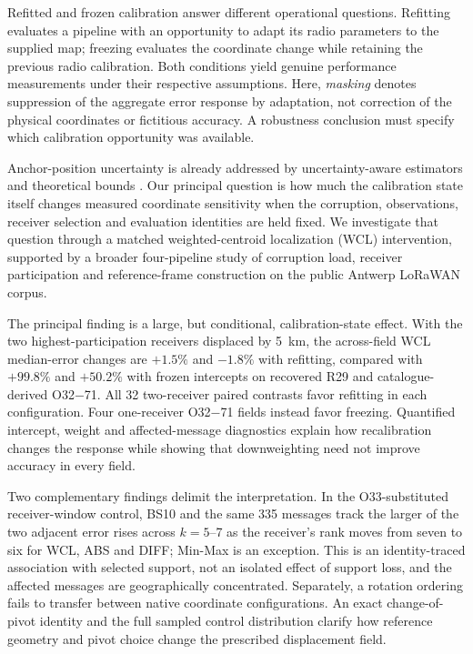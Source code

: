 \documentclass[11pt,a4paper]{article}
\begin{document}
Refitted and frozen calibration answer different operational questions. Refitting evaluates a pipeline with an opportunity to adapt its radio parameters to the supplied map; freezing evaluates the coordinate change while retaining the previous radio calibration. Both conditions yield genuine performance measurements under their respective assumptions. Here, \emph{masking} denotes suppression of the aggregate error response by adaptation, not correction of the physical coordinates or fictitious accuracy. A robustness conclusion must specify which calibration opportunity was available.

Anchor-position uncertainty is already addressed by uncertainty-aware estimators and theoretical bounds \cite{ref1,ref2,ref3,ref4,ref5,ref6,ref7,ref8,ref9,ref10,ref11,ref12,ref13,ref14}. Our principal question is how much the calibration state itself changes measured coordinate sensitivity when the corruption, observations, receiver selection and evaluation identities are held fixed. We investigate that question through a matched weighted-centroid localization (WCL) intervention, supported by a broader four-pipeline study of corruption load, receiver participation and reference-frame construction on the public Antwerp LoRaWAN corpus.

The principal finding is a large, but conditional, calibration-state effect. With the two highest-participation receivers displaced by 5~km, the across-field WCL median-error changes are $+1.5\%$ and $-1.8\%$ with refitting, compared with $+99.8\%$ and $+50.2\%$ with frozen intercepts on recovered R29 and catalogue-derived O32$-$71. All 32 two-receiver paired contrasts favor refitting in each configuration. Four one-receiver O32$-$71 fields instead favor freezing. Quantified intercept, weight and affected-message diagnostics explain how recalibration changes the response while showing that downweighting need not improve accuracy in every field.

Two complementary findings delimit the interpretation. In the O33-substituted receiver-window control, BS10 and the same 335 messages track the larger of the two adjacent error rises across $k=5$--7 as the receiver's rank moves from seven to six for WCL, ABS and DIFF; Min-Max is an exception. This is an identity-traced association with selected support, not an isolated effect of support loss, and the affected messages are geographically concentrated. Separately, a rotation ordering fails to transfer between native coordinate configurations. An exact change-of-pivot identity and the full sampled control distribution clarify how reference geometry and pivot choice change the prescribed displacement field.
\end{document}
